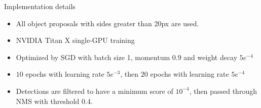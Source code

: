 \documentclass[final, xcolor={dvipsnames}]{beamer}
\begin{document}
\begin{frame}[t,fragile]{}
\begin{mdframed}[style = posterframe]
\begin{columns}[t,onlytextwidth]
\begin{column}{.26\linewidth}
	\begin{block}{Implementation details}
		\begin{itemize}
			\item All object proposals with sides greater than 20px are used.
			\item NVIDIA Titan X single-GPU training
			\item Optimized by SGD with batch size 1, momentum $0.9$ and weight decay $5e^{-4}$
			\item $10$ epochs with learning rate $5e^{-3}$, then $20$ epochs with learning rate $5e^{-4}$
			\item Detections are filtered to have a minimum score of $10^{-4}$, then passed through NMS with threshold 0.4.
		\end{itemize}
	\end{block}
\end{column}
\end{columns}

\end{mdframed}
\end{frame}
\end{document}
